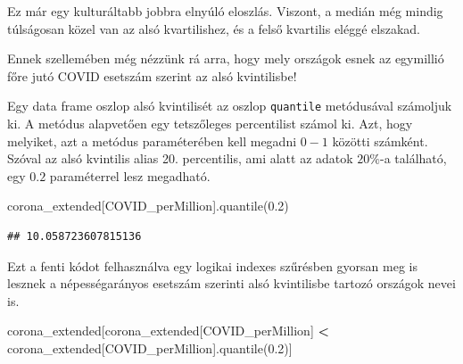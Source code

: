 \documentclass[
]{book}
\newenvironment{Shaded}{\begin{snugshade}}{\end{snugshade}}
\newcommand{\FloatTok}[1]{\textcolor[rgb]{0.00,0.00,0.81}{#1}}
\newcommand{\NormalTok}[1]{#1}
\newcommand{\OperatorTok}[1]{\textcolor[rgb]{0.81,0.36,0.00}{\textbf{#1}}}
\newcommand{\StringTok}[1]{\textcolor[rgb]{0.31,0.60,0.02}{#1}}
\begin{document}
Ez már egy kulturáltabb jobbra elnyúló eloszlás. Viszont, a medián még mindig túlságosan közel van az alsó kvartilishez, és a felső kvartilis eléggé elszakad.

Ennek szellemében még nézzünk rá arra, hogy mely országok esnek az egymillió főre jutó COVID esetszám szerint az alsó kvintilisbe!

Egy data frame oszlop alsó kvintilisét az oszlop \texttt{quantile} metódusával számoljuk ki. A metódus alapvetően egy tetszőleges percentilist számol ki. Azt, hogy melyiket, azt a metódus paraméterében kell megadni \(0-1\) közötti számként. Szóval az alsó kvintilis alias 20. percentilis, ami alatt az adatok \(20\%\)-a található, egy \(0.2\) paraméterrel lesz megadható.

\begin{Shaded}
\begin{Highlighting}[]
\NormalTok{corona\_extended[}\StringTok{\textquotesingle{}COVID\_perMillion\textquotesingle{}}\NormalTok{].quantile(}\FloatTok{0.2}\NormalTok{)}
\end{Highlighting}
\end{Shaded}

\begin{verbatim}
## 10.058723607815136
\end{verbatim}

Ezt a fenti kódot felhasználva egy logikai indexes szűrésben gyorsan meg is lesznek a népességarányos esetszám szerinti alsó kvintilisbe tartozó országok nevei is.

\begin{Shaded}
\begin{Highlighting}[]
\NormalTok{corona\_extended[corona\_extended[}\StringTok{\textquotesingle{}COVID\_perMillion\textquotesingle{}}\NormalTok{] }\OperatorTok{\textless{}} 
\NormalTok{               corona\_extended[}\StringTok{\textquotesingle{}COVID\_perMillion\textquotesingle{}}\NormalTok{].quantile(}\FloatTok{0.2}\NormalTok{)]}
\end{Highlighting}
\end{Shaded}
\end{document}
